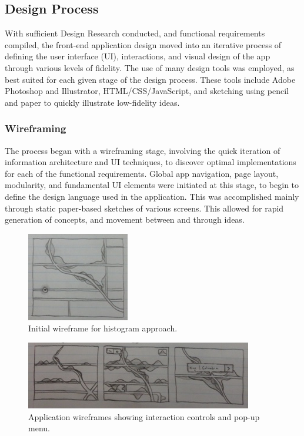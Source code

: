\documentclass{report}
\begin{document}
\subsection{Design Process}
With sufficient Design Research conducted, and functional requirements compiled, the front-end application design moved into an iterative process of defining the user interface (UI), interactions, and visual design of the app through various levels of fidelity.
The use of many design tools was employed, as best suited for each given stage of the design process. 
These tools include Adobe Photoshop and Illustrator, HTML/CSS/JavaScript, and sketching using pencil and paper to quickly illustrate low-fidelity ideas.

\subsubsection{Wireframing}
The process began with a wireframing stage, involving the quick iteration of information architecture and UI techniques, to discover optimal implementations for each of the functional requirements.
Global app navigation, page layout, modularity, and fundamental UI elements were initiated at this stage, to begin to define the design language used in the application.
This was accomplished mainly through static paper-based sketches of various screens.
This allowed for rapid generation of concepts, and movement between and through ideas. 

\begin{figure}[htbp!]
  \begin{centering}
    \includegraphics[scale=1]{figures/wire-1.png}
    \caption{Initial wireframe for histogram approach.}
    \label{fig:wire-1}
  \end{centering}
\end{figure}

\begin{figure}[htbp!]
  \begin{centering}
    \includegraphics[scale=1]{figures/wire-2.png}
    \caption{Application wireframes showing interaction controls and pop-up menu.}
    \label{fig:wire-2}
  \end{centering}
\end{figure}
\end{document}

